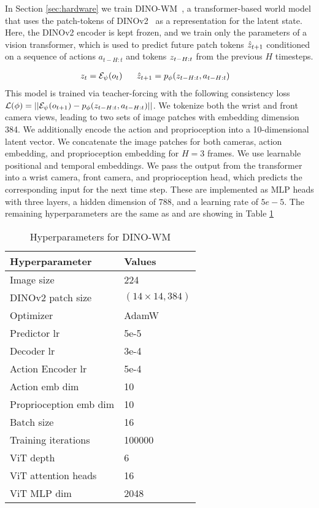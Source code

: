 In Section \ref{sec:hardware} we train DINO-WM~\cite{zhou2024dinowm}, a transformer-based world model that uses the patch-tokens of DINOv2~\cite{oquab2023dinov2} as a representation for the latent state. Here, the DINOv2 encoder is kept frozen, and we train only the parameters of a vision transformer, which is used to predict future patch tokens $\hat{z}_{t+1}$ conditioned on a sequence of actions $a_{t-H:t}$ and tokens $z_{t-H:t}$ from the previous $H$ timesteps.

\begin{equation}
\begin{aligned}
    &z_{t} = \mathcal{E}_\psi(o_t) \;\;\;\;\;\; \hat{z}_{t+1} = p_{\phi}(z_{t-H:t}, a_{t-H:t})
\end{aligned}
\end{equation}
This model is trained via teacher-forcing with the following consistency loss
$\mathcal{L}(\phi) = || \mathcal{E}_\psi(o_{t+1}) - p_{\phi}(z_{t-H:t}, a_{t-H:t})||$. We tokenize both the wrist and front camera views, leading to two sets of image patches with embedding dimension 384. We additionally encode the action and proprioception into a 10-dimensional latent vector. We concatenate the image patches for both cameras, action embedding, and proprioception embedding for $H=3$ frames. We use learnable positional and temporal embeddings. We pass the output from the transformer into a wrist camera, front camera, and proprioception head, which predicts the corresponding input for the next time step. These are implemented as MLP heads with three layers, a hidden dimension of $788$, and a learning rate of $5e-5$. The remaining hyperparameters are the same as \cite{zhou2024dinowm} and are showing in Table \ref{tab:dinowm}
\begin{table}[h]
    \centering
    \begin{tabular}{l l}
        \toprule
        \textbf{Hyperparameter} & \textbf{Values}  \\
        \midrule
        Image size & 224 \\
        DINOv2 patch size & $(14 \times 14, 384)$ \\ 
        Optimizer & AdamW \\
        Predictor lr & 5e-5  \\
        Decoder lr & 3e-4 \\
        Action Encoder lr & 5e-4 \\
        Action emb dim & 10 \\
        Proprioception emb dim & 10 \\
        Batch size & 16 \\
        Training iterations & 100000 \\
        ViT depth & 6 \\
        ViT attention heads & 16 \\
        ViT MLP dim & 2048 \\
    \bottomrule
    \end{tabular}
    \caption{Hyperparameters for DINO-WM}
    \label{tab:dinowm}
\end{table}

